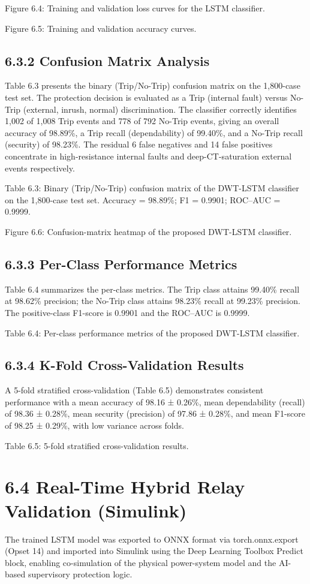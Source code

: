 Figure 6.4: Training and validation loss curves for the LSTM classifier.

Figure 6.5: Training and validation accuracy curves.


\subsection{6.3.2  Confusion Matrix Analysis}
Table 6.3 presents the binary (Trip/No-Trip) confusion matrix on the 1,800-case test set. The protection decision is evaluated as a Trip (internal fault) versus No-Trip (external, inrush, normal) discrimination. The classifier correctly identifies 1,002 of 1,008 Trip events and 778 of 792 No-Trip events, giving an overall accuracy of 98.89\%, a Trip recall (dependability) of 99.40\%, and a No-Trip recall (security) of 98.23\%. The residual 6 false negatives and 14 false positives concentrate in high-resistance internal faults and deep-CT-saturation external events respectively.

Table 6.3: Binary (Trip/No-Trip) confusion matrix of the DWT-LSTM classifier on the 1,800-case test set. Accuracy = 98.89\%; F1 = 0.9901; ROC--AUC = 0.9999.

Figure 6.6: Confusion-matrix heatmap of the proposed DWT-LSTM classifier.


\subsection{6.3.3  Per-Class Performance Metrics}
Table 6.4 summarizes the per-class metrics. The Trip class attains 99.40\% recall at 98.62\% precision; the No-Trip class attains 98.23\% recall at 99.23\% precision. The positive-class F1-score is 0.9901 and the ROC--AUC is 0.9999.

Table 6.4: Per-class performance metrics of the proposed DWT-LSTM classifier.


\subsection{6.3.4  K-Fold Cross-Validation Results}
A 5-fold stratified cross-validation (Table 6.5) demonstrates consistent performance with a mean accuracy of 98.16 ± 0.26\%, mean dependability (recall) of 98.36 ± 0.28\%, mean security (precision) of 97.86 ± 0.28\%, and mean F1-score of 98.25 ± 0.29\%, with low variance across folds.

Table 6.5: 5-fold stratified cross-validation results.


\section{6.4  Real-Time Hybrid Relay Validation (Simulink)}
The trained LSTM model was exported to ONNX format via torch.onnx.export (Opset 14) and imported into Simulink using the Deep Learning Toolbox Predict block, enabling co-simulation of the physical power-system model and the AI-based supervisory protection logic.


